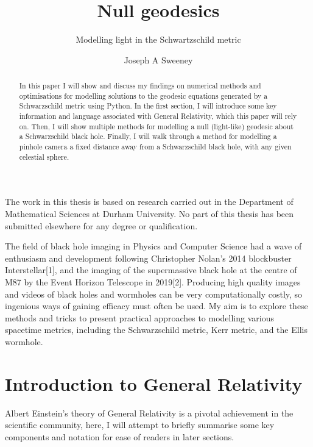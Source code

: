 \documentclass[oneside,openright,frontopenright]{dmathesis}
\begin{document}
\title{Null geodesics}
\subtitle{Modelling light in the Schwartzschild metric}
\author{Joseph A Sweeney}
\maketitlepage*

\begin{abstract}
%
	In this paper I will show and discuss my findings on numerical methods and optimisations for modelling solutions to the geodesic equations generated by a Schwarzschild metric using Python. In the first section, I will introduce some key information and language associated with General Relativity, which this paper will rely on. Then, I will show multiple methods for modelling a null (light-like) geodesic about a Schwarzschild black hole. Finally, I will walk through a method for modelling a pinhole camera a fixed distance away from a Schwarzschild black hole, with any given celestial sphere.
%
\end{abstract}

\begin{declaration*}
%
	The work in this thesis is based on research carried out in the Department of
	Mathematical Sciences at Durham University. No part of this thesis has been
	submitted elsewhere for any degree or qualification.
%
\end{declaration*}

\disableprotrusion
\tableofcontents*
\enableprotrusion

\cleardoublepage
{}

%
%
%
%
\begin{introduction}

	The field of black hole imaging in Physics and Computer Science had a wave of enthusiasm 
	and development following Christopher Nolan’s 2014 blockbuster Interstellar[1], and the imaging of the supermassive 
	black hole at the centre of M87 by the Event Horizon Telescope in 2019[2]. Producing high quality images 
	and videos of black holes and wormholes can be very computationally costly, so ingenious ways of gaining 
	efficacy must often be used. My aim is to explore these methods and tricks to present practical approaches 
	to modelling various spacetime metrics, including the Schwarzschild metric, Kerr metric, and the Ellis wormhole.

\end{introduction}

\chapter{Introduction to General Relativity}
	Albert Einstein’s theory of General Relativity is a pivotal achievement in the scientific community, here, I will attempt to briefly summarise some key components and notation for ease of readers in later sections.
\end{document}
